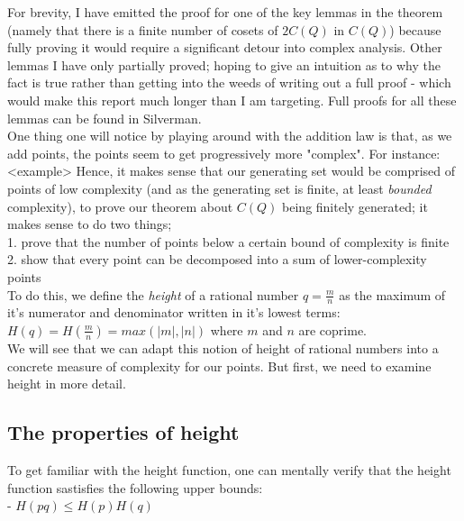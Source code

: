 \documentclass{article}
\begin{document}
For brevity, I have emitted the proof for one of the key lemmas in the theorem (namely that there is a finite number of cosets of $2C(Q)$ in $C(Q)$) because fully proving it would require a significant detour into complex analysis. Other lemmas I have only partially proved; hoping to give an intuition as to why the fact is true rather than getting into the weeds of writing out a full proof - which would make this report much longer than I am targeting. Full proofs for all these lemmas can be found in Silverman.\\

One thing one will notice by playing around with the addition law is that, as we add points, the points seem to get progressively more "complex". For instance: <example>
Hence, it makes sense that our generating set would be comprised of points of low complexity (and as the generating set is finite, at least \emph{bounded} complexity), to prove our theorem about $C(Q)$ being finitely generated; it makes sense to do two things;\\

1. prove that the number of points below a certain bound of complexity is finite \\

2. show that every point can be decomposed into a sum of lower-complexity points \\

To do this, we define the \emph{height} of a rational number $q = \frac{m}{n}$ as the maximum of it's numerator and denominator written in it's lowest terms:\\

$H(q) = H(\frac{m}{n}) = max(|m|, |n|)$ where $m$ and $n$ are coprime.\\

We will see that we can adapt this notion of height of rational numbers into a concrete measure of complexity for our points. But first, we need to examine height in more detail.

\subsection{The properties of height}

To get familiar with the height function, one can mentally verify that the height function sastisfies the following upper bounds:\\

- $H(pq) \leq H(p)H(q)$\\
\end{document}
